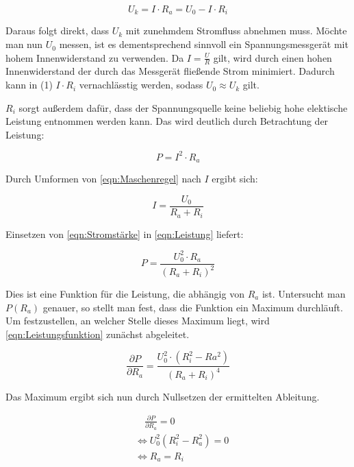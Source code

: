 \begin{equation}
U_k = I\cdot R_a = U_0 - I\cdot R_i
\label{eqn:Maschenregel}
\end{equation}

Daraus folgt direkt, dass $U_k$ mit zunehmdem Stromfluss abnehmen muss. 
Möchte man nun $U_0$ messen, ist es dementsprechend sinnvoll ein Spannungsmessgerät
mit hohem Innenwiderstand zu verwenden. Da $I=\frac{U}{R}$ gilt, wird durch einen
hohen Innenwiderstand der durch das Messgerät fließende Strom minimiert. Dadurch kann in 
(1) $I\cdot R_i$ vernachlässtig werden, sodass $U_0\approx U_k$ gilt.

$R_i$ sorgt außerdem dafür, dass der Spannungsquelle keine beliebig hohe
elektische Leistung entnommen werden kann. Das wird deutlich durch Betrachtung der
Leistung: 

\begin{equation}
P = I^2\cdot R_a
\label{eqn:Leistung}
\end{equation}

Durch Umformen von \eqref{eqn:Maschenregel} nach $I$ ergibt sich:

\begin{equation}
I = \frac{U_0}{R_a + R_i}
\label{eqn:Stromstärke}
\end{equation}

Einsetzen von \eqref{eqn:Stromstärke} in \eqref{eqn:Leistung} liefert:

\begin{equation}
P = \frac{U_0^2\cdot R_a}{(R_a + R_i)^2}
\label{eqn:Leistungsfunktion}
\end{equation}

Dies ist eine Funktion für die Leistung, die abhängig von $R_a$ ist. 
Untersucht man $P(R_a)$ genauer, so stellt man fest, dass die Funktion
ein Maximum durchläuft. Um festzustellen, an welcher Stelle dieses 
Maximum liegt, wird \eqref{eqn:Leistungsfunktion} zunächst abgeleitet.

\begin{equation}
\frac{\partial P}{\partial R_a} = \frac{U_0^2\cdot (R_i^2 - Ra^2)}{(R_a+R_i)^4}
\end{equation}

Das Maximum ergibt sich nun durch Nullsetzen der ermittelten Ableitung. 

\begin{align*}
&\quad \frac{\partial P}{\partial R_a} = 0 \\
&\Leftrightarrow U_0^2(R_i^2-R_a^2) = 0 \\
&\Leftrightarrow R_a = R_i 
\end{align*}

